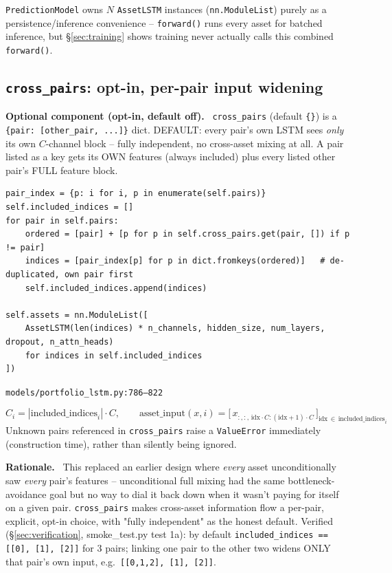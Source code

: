 \documentclass[11pt]{article}
\newcommand{\srcref}[1]{\hfill\textcolor{cmtcolor}{\footnotesize\texttt{#1}}}
\newcommand{\code}[1]{\texttt{\small #1}}
\newcommand{\rationalelabel}{\small\textbf{Rationale.}~}
\newcommand{\optionallabel}{\small\textbf{Optional component (opt-in, default off).}~}
\begin{document}
\texttt{PredictionModel} owns $N$ \texttt{AssetLSTM} instances (\code{nn.ModuleList}) purely
as a persistence/inference convenience -- \code{forward()} runs every asset for batched
inference, but \S\ref{sec:training} shows training never actually calls this combined
\code{forward()}.

\subsection{\texttt{cross\_pairs}: opt-in, per-pair input widening}
\label{sec:crosspairs}

\begin{optional}\optionallabel
\texttt{cross\_pairs} (default \code{\{\}}) is a \code{\{pair: [other\_pair, ...]\}} dict.
DEFAULT: every pair's own LSTM sees \emph{only} its own $C$-channel block -- fully
independent, no cross-asset mixing at all. A pair listed as a key gets its OWN features
(always included) plus every listed other pair's FULL feature block.
\end{optional}

\begin{lstlisting}[caption={Building each asset's own input-slice indices.}, label=lst:crosspairs]
pair_index = {p: i for i, p in enumerate(self.pairs)}
self.included_indices = []
for pair in self.pairs:
    ordered = [pair] + [p for p in self.cross_pairs.get(pair, []) if p != pair]
    indices = [pair_index[p] for p in dict.fromkeys(ordered)]   # de-duplicated, own pair first
    self.included_indices.append(indices)

self.assets = nn.ModuleList([
    AssetLSTM(len(indices) * n_channels, hidden_size, num_layers, dropout, n_attn_heads)
    for indices in self.included_indices
])
\end{lstlisting}
\srcref{models/portfolio\_lstm.py:786--822}

\begin{equation}
  C_i = |\text{included\_indices}_i| \cdot C, \qquad
  \text{asset\_input}(x, i) = \big[\, x_{:,:,\,\text{idx}\cdot C : (\text{idx}+1)\cdot C} \,\big]_{\text{idx}\,\in\,\text{included\_indices}_i}
  \label{eq:assetinput}
\end{equation}
Unknown pairs referenced in \texttt{cross\_pairs} raise a \code{ValueError} immediately
(construction time), rather than silently being ignored.

\begin{rationale}\rationalelabel
This replaced an earlier design where \emph{every} asset unconditionally saw \emph{every}
pair's features -- unconditional full mixing had the same bottleneck-avoidance goal but no
way to dial it back down when it wasn't paying for itself on a given pair. \texttt{cross\_pairs}
makes cross-asset information flow a per-pair, explicit, opt-in choice, with "fully
independent" as the honest default. Verified (\S\ref{sec:verification}, smoke\_test.py test
1a): by default \code{included\_indices == [[0], [1], [2]]} for 3 pairs; linking one pair to
the other two widens ONLY that pair's own input, e.g.\ \code{[[0,1,2], [1], [2]]}.
\end{rationale}
\end{document}
